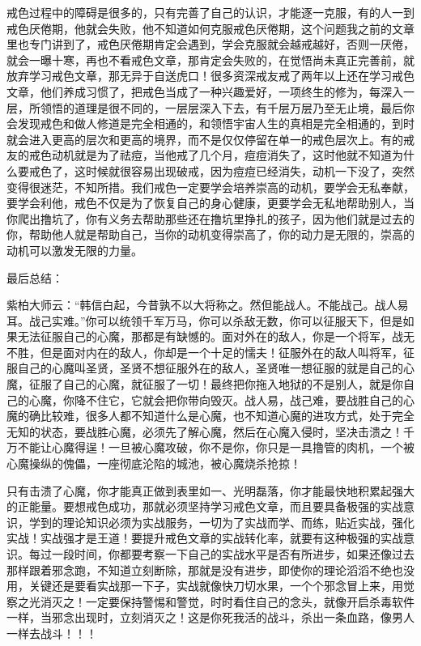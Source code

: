 戒色过程中的障碍是很多的，只有完善了自己的认识，才能逐一克服，有的人一到戒色厌倦期，他就会失败，他不知道如何克服戒色厌倦期，这个问题我之前的文章里也专门讲到了，戒色厌倦期肯定会遇到，学会克服就会越戒越好，否则一厌倦，就会一曝十寒，再也不看戒色文章，那肯定会失败的，在觉悟尚未真正完善前，就放弃学习戒色文章，那无异于自送虎口！很多资深戒友戒了两年以上还在学习戒色文章，他们养成习惯了，把戒色当成了一种兴趣爱好，一项终生的修为，每深入一层，所领悟的道理是很不同的，一层层深入下去，有千层万层乃至无止境，最后你会发现戒色和做人修道是完全相通的，和领悟宇宙人生的真相是完全相通的，到时就会进入更高的层次和更高的境界，而不是仅仅停留在单一的戒色层次上。有的戒友的戒色动机就是为了祛痘，当他戒了几个月，痘痘消失了，这时他就不知道为什么要戒色了，这时候就很容易出现破戒，因为痘痘已经消失，动机一下没了，突然变得很迷茫，不知所措。我们戒色一定要学会培养崇高的动机，要学会无私奉献，要学会利他，戒色不仅是为了恢复自己的身心健康，更要学会无私地帮助别人，当你爬出撸坑了，你有义务去帮助那些还在撸坑里挣扎的孩子，因为他们就是过去的你，帮助他人就是帮助自己，当你的动机变得崇高了，你的动力是无限的，崇高的动机可以激发无限的力量。

最后总结：

紫柏大师云：“韩信白起，今昔孰不以大将称之。然但能战人。不能战己。战人易耳。战己实难。”你可以统领千军万马，你可以杀敌无数，你可以征服天下，但是如果无法征服自己的心魔，那都是有缺憾的。面对外在的敌人，你是一个将军，战无不胜，但是面对内在的敌人，你却是一个十足的懦夫！征服外在的敌人叫将军，征服自己的心魔叫圣贤，圣贤不想征服外在的敌人，圣贤唯一想征服的就是自己的心魔，征服了自己的心魔，就征服了一切！最终把你拖入地狱的不是别人，就是你自己的心魔，你降不住它，它就会把你带向毁灭。战人易，战己难，要战胜自己的心魔的确比较难，很多人都不知道什么是心魔，也不知道心魔的进攻方式，处于完全无知的状态，要战胜心魔，必须先了解心魔，然后在心魔入侵时，坚决击溃之！千万不能让心魔得逞！一旦被心魔攻破，你不是你，你只是一具撸管的肉机，一个被心魔操纵的傀儡，一座彻底沦陷的城池，被心魔烧杀抢掠！

只有击溃了心魔，你才能真正做到表里如一、光明磊落，你才能最快地积累起强大的正能量。要想戒色成功，那就必须坚持学习戒色文章，而且要具备极强的实战意识，学到的理论知识必须为实战服务，一切为了实战而学、而练，贴近实战，强化实战！实战强才是王道！要提升戒色文章的实战转化率，就要有这种极强的实战意识。每过一段时间，你都要考察一下自己的实战水平是否有所进步，如果还像过去那样跟着邪念跑，不知道立刻断除，那就是没有进步，即使你的理论滔滔不绝也没用，关键还是要看实战那一下子，实战就像快刀切水果，一个个邪念冒上来，用觉察之光消灭之！一定要保持警惕和警觉，时时看住自己的念头，就像开启杀毒软件一样，当邪念出现时，立刻消灭之！这是你死我活的战斗，杀出一条血路，像男人一样去战斗！！！

